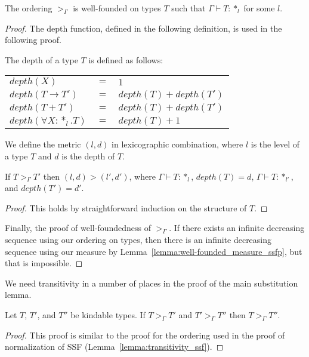 \begin{thm}
  The ordering $>_\Gamma$ is well-founded on types $T$ such that 
  $\Gamma \vdash T:*_l$ for some $l$.
  \label{thm:well-founded_ordering_ssfp}
\end{thm}
\begin{proof}
  The depth function, defined in the following definition, is used in the following proof.

  \begin{definition}
    The depth of a type $T$ is defined as follows:
    \begin{center}
      \begin{tabular}{lll}
        $depth(X)$                  & $=$ & $1$\\
        $depth(T \to T')$     & $=$ & $depth(T) + depth(T')$\\
        $depth(T + T')$       & $=$ & $depth(T) + depth(T')$\\
        $depth(\forall X:*_l.T)$ & $=$ & $depth(T) + 1$\\
      \end{tabular}
    \end{center}
  \end{definition}

  We define the metric $(l,d)$ in lexicographic combination, where $l$
  is the level of a type $T$ and $d$ is the depth of $T$.

  \begin{lemma}
    \label{lemma:well-founded_measure_ssfp}
    If $T >_\Gamma T'$ then $(l,d) > (l',d')$, where $\Gamma \vdash T:*_l$, 
    $depth(T) = d$,  $\Gamma \vdash T:*_{l'}$, and $depth(T') = d'$.
  \end{lemma}
  \begin{proof}
    This holds by straightforward induction on the structure of
    $T$. 
  \end{proof}
  
  Finally, the proof of well-foundedness of $>_\Gamma$.  If there exists
  an infinite decreasing sequence using our ordering on types, then there
  is an infinite decreasing sequence using our measure by
  Lemma~\ref{lemma:well-founded_measure_ssfp}, but that is impossible.
\end{proof}
\noindent
We need transitivity in a number of places in the proof of the main
substitution lemma.  

\begin{lemma}
  Let $T$, $T'$, and $T''$ be kindable types.  If $T >_\Gamma T'$ and 
  $T' >_\Gamma T''$ then $T >_\Gamma T''$.
  \label{lemma:transitivity_ssfp}
\end{lemma}
\begin{proof}
  This proof is similar to the proof for the ordering used in the
  proof of normalization of SSF (Lemma~\ref{lemma:transitivity_ssf}).
\end{proof}

